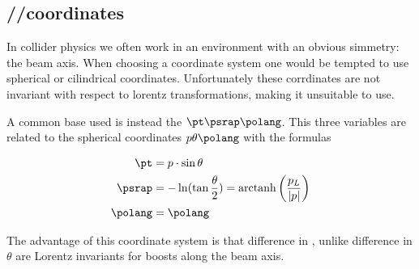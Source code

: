 \subsection{\pt/\psrap/\polang coordinates}

In collider physics we often work in an environment with an obvious simmetry: the beam axis.
When choosing a coordinate system one would be tempted to use spherical or cilindrical coordinates.
Unfortunately these corrdinates are not invariant with respect to lorentz transformations, making it unsuitable to use.

A common base used is instead the $\pt\psrap\polang$.
This three variables are related to the spherical coordinates $p\theta\polang$ with the formulas


\begin{align}
	\pt&=p\cdot\sin{\theta}\\
	\psrap&=-\ln(\tan{\frac{\theta}{2}})=\mathrm{arctanh}\left(\frac{p_L}{|p|}\right)\\
	\polang&=\polang
	\label{eq:pt_eta_phi}
\end{align}

The advantage of this coordinate system is that difference in \psrap, unlike difference in $\theta$ are Lorentz invariants for boosts along the beam axis.
